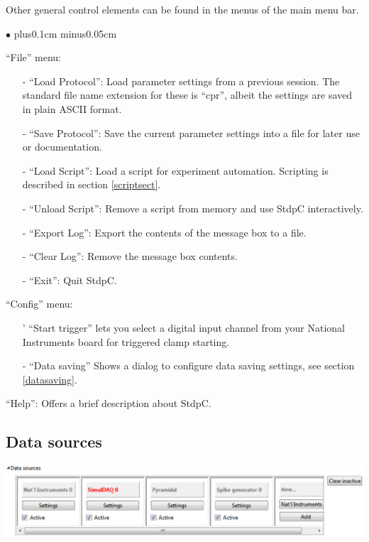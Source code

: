 \documentclass{article}
\newenvironment{myitem}{\begin{list}{$\bullet$}{\setlength{\leftmargin}{1.1em}
\itemsep0.1cm plus0.1cm minus0.05cm
\listparindent0cm
\addtolength{\labelsep}{0.5\labelsep}
\setlength{\labelwidth}{0.8em}
\setlength{\leftmargin}{\labelwidth}
\addtolength{\leftmargin}{\labelsep}
}}{\end{list}}
\begin{document}
Other general control elements can be found in the menus of the main
menu bar. 
\begin{myitem}
\item ``File'' menu:
\
\begin{itemize}
\item[-] ``Load Protocol'': Load parameter settings from a previous
  session. The standard file name extension for these is ``cpr'',
  albeit the settings are saved in plain ASCII format.
\item[-] ``Save Protocol'': Save the current parameter settings into a
  file for later use or documentation.
 \item[-] ``Load Script'': Load a script for experiment
   automation. Scripting is described in section \ref{scriptsect}.
\item[-] ``Unload Script'': Remove a script from memory and use StdpC
  interactively.
\item[-] ``Export Log'': Export the contents of the message box to a
  file.
\item[-] ``Clear Log'': Remove the message box contents.
\item[-] ``Exit'': Quit StdpC.
\end{itemize}
\item ``Config'' menu:
\begin{itemize}
\item['] ``Start trigger'' lets you select a digital input channel from your National Instruments
board for triggered clamp starting.
\item[-] ``Data saving'' Shows a dialog to configure data saving
  settings, see section \ref{datasaving}.
\end{itemize}
\item ``Help'': Offers a brief description about StdpC. 
\end{myitem}


\subsection{Data sources}

\noindent
\parbox{\textwidth}{
	\includegraphics[scale=0.5]{datasources}
} \\[0.2cm]
\end{document}
